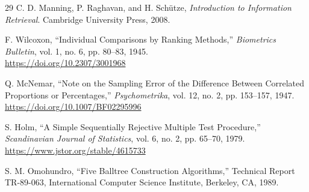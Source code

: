 \documentclass[runningheads]{llncs}
\begin{document}
\begin{thebibliography}{29}
C. D. Manning, P. Raghavan, and H. Sch\"utze, \textit{Introduction to Information
Retrieval}. Cambridge University Press, 2008.

F. Wilcoxon, ``Individual Comparisons by Ranking Methods,'' \textit{Biometrics Bulletin},
vol. 1, no. 6, pp. 80--83, 1945.\\
\url{https://doi.org/10.2307/3001968}

Q. McNemar, ``Note on the Sampling Error of the Difference Between Correlated Proportions
or Percentages,'' \textit{Psychometrika}, vol. 12, no. 2, pp. 153--157, 1947.\\
\url{https://doi.org/10.1007/BF02295996}

S. Holm, ``A Simple Sequentially Rejective Multiple Test Procedure,'' \textit{Scandinavian
Journal of Statistics}, vol. 6, no. 2, pp. 65--70, 1979.\\
\url{https://www.jstor.org/stable/4615733}

S. M. Omohundro, ``Five Balltree Construction Algorithms,'' Technical Report TR-89-063,
International Computer Science Institute, Berkeley, CA, 1989.

\end{thebibliography}
\end{document}
